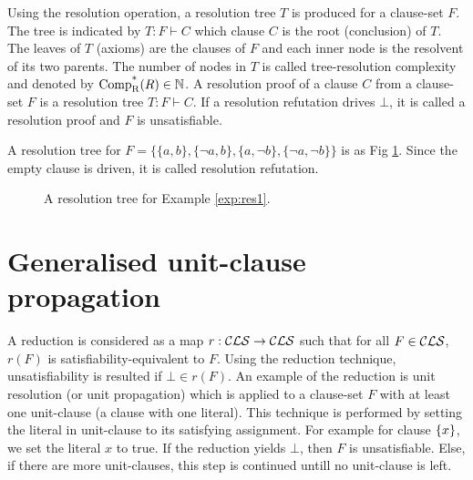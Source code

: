 \documentclass[]{book}
\begin{document}
Using the resolution operation, a resolution tree $T$ is produced for a clause-set $F$. The tree is indicated by $T : F \vdash C$ which clause $C$ is the root (conclusion) of $T$. The leaves of $T$ (axioms) are the clauses of $F$ and each inner node is the resolvent of its two parents. The number of nodes in $T$ is called tree-resolution complexity and denoted by $\operatorname{\operatorname{Comp}_{R}^*}(R) \in \mathbb{N}$. A resolution proof of a clause $C$ from a clause-set $F$ is a resolution tree $T : F \vdash C$. If a resolution refutation drives $\bot$, it is called a resolution proof and $F$ is unsatisfiable.

\begin{examp}\label{exp:res1}
A resolution tree for $F = \{\{a,b\},\{\neg a,b\},\{a, \neg b\},\{\neg a, \neg b\}\}$ is as Fig \ref{fig:resol1}. Since the empty clause is driven, it is called resolution refutation.
	   \begin{figure}
	   \centering  
	   \caption{A resolution tree for Example \ref{exp:res1}.}
	   \label{fig:resol1}
       \end{figure}
\end{examp}

\section{Generalised unit-clause propagation}
\label{sec:rkred}

A reduction is considered as a map $r: \mathcal{CLS} \rightarrow \mathcal{CLS}$ such that for all $F \in \mathcal{CLS}$, $r(F)$ is satisfiability-equivalent to $F$. Using the reduction technique, unsatisfiability is resulted if $\bot \in r(F)$. An example of the reduction is unit resolution (or unit propagation) which is applied to a clause-set $F$ with at least one unit-clause (a clause with one literal). This technique is performed by setting the literal in unit-clause to its satisfying assignment. For example for clause $\{ x \}$, we set the literal $x$ to true. If the reduction yields $\bot$, then $F$ is unsatisfiable. Else, if there are more unit-clauses, this step is continued untill no unit-clause is left.
\end{document}
